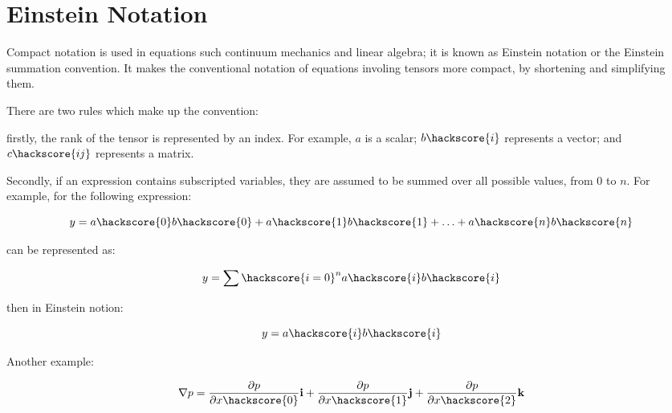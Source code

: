 
%
%
%


\section{Einstein Notation}
\label{EINSTEIN NOTATION}

Compact notation is used in equations such continuum mechanics and linear algebra; it is known as Einstein notation or the Einstein summation convention. It makes the conventional notation of equations involing tensors more compact, by shortening and simplifying them.

There are two rules which make up the convention:

firstly, the rank of the tensor is represented by an index. For example, $a$ is a scalar; $b\hackscore{i}$ represents a vector; and $c\hackscore{ij}$ represents a matrix.

Secondly, if an expression contains subscripted variables, they are assumed to be summed over all possible values, from $0$ to $n$. For example, for the following expression:



\begin{equation}
y = a\hackscore{0}b\hackscore{0} + a\hackscore{1}b\hackscore{1} + \ldots + a\hackscore{n}b\hackscore{n}
\label{NOTATION1}
\end{equation}

can be represented as:

\begin{equation}
y = \sum\hackscore{i=0}^n  a\hackscore{i}b\hackscore{i}
\label{NOTATION2}
\end{equation}

then in Einstein notion:

\begin{equation}
y = a\hackscore{i}b\hackscore{i}
\label{NOTATION3}
\end{equation}

Another example:

\begin{equation}
\nabla p = \frac{\partial p}{\partial x\hackscore{0}}\textbf{i} + \frac{\partial p}{\partial x\hackscore{1}}\textbf{j} + \frac{\partial p}{\partial x\hackscore{2}}\textbf{k}
\label{NOTATION4}
\end{equation}

